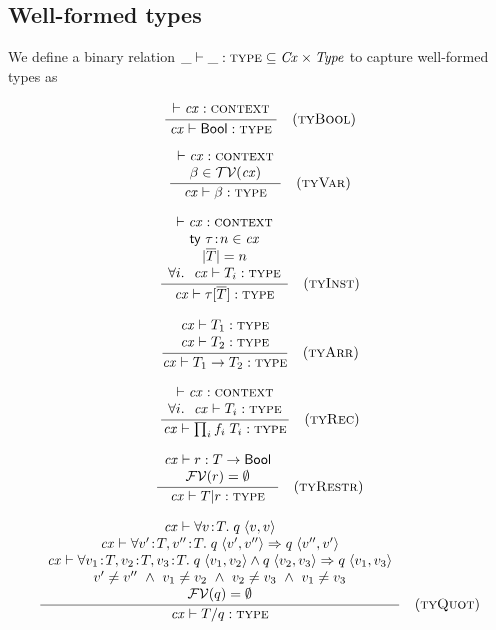 \subsection{Well-formed types}

We define a binary relation $\binrel{\istyY}{\Cx}{\Typ}$ to capture
well-formed types as

\[
\rruleI
 {\cxwfO}
 {\istyO{\bool}}
 {\Rtbool}
\]

\[
\rruleII
 {\cxwfO}
 {\tvar\in\cxtvarO}
 {\istyO{\tvar}}
 {\Rtvar}
\]

\[
\rruleIV
 {\cxwfO}
 {\tdecO\in\cx}
 {\seqlen{\typS}=n}
 {\FORALL{i}{\istyO{\typ_i}}}
 {\istyO{\tinstO}}
 {\Rtinst}
\]

\[
\rruleII
 {\istyO{\typ_1}}
 {\istyO{\typ_2}}
 {\istyO{\tarrO}}
 {\Rtarr}
\]

\[
\rruleII
 {\cxwfO}
 {\FORALL{i}{\istyO{\typ_i}}}
 {\istyO{\trecO}}
 {\Rtrec}
\]


\[
\rruleII
 {\hastyO{\tspred}{\tarr{\typ}{\bool}}}
 {\efvar{\tspred}=\emptyset}
 {\istyO{\tsubO}}
 {\Rtsub}
\]

\[
\rruleV
 {\theoO{\fa{\var}{\typ}{\app{\tqpred}{\tupleII{\var}{\var}}}}}
 {\theoO{\faS{\seqII{\bnd{\var'}{\typ}}{\bnd{\var''}{\typ}}}
             {\impl{\app{\tqpred}{\tupleII{\var'}{\var''}}}
                   {\app{\tqpred}{\tupleII{\var''}{\var'}}}}}}
 {\theoO{\faS{\seqIII{\bnd{\var_1}{\typ}}{\bnd{\var_2}{\typ}}{\bnd{\var_3}{\typ}}}
             {\impl{\conj{\app{\tqpred}{\tupleII{\var_1}{\var_2}}}
                         {\app{\tqpred}{\tupleII{\var_2}{\var_3}}}}
                   {\app{\tqpred}{\tupleII{\var_1}{\var_3}}}}}}
 {\var'\neq\var''\AND\var_1\neq\var_2\AND\var_2\neq\var_3\AND\var_1\neq\var_3}
 {\efvar{\tqpred}=\emptyset}
 {\istyO{\tquotO}}
 {\Rtquot}
\]

